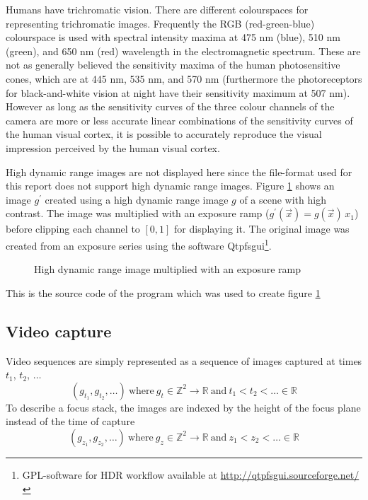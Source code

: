 \documentclass[a4paper,12pt]{book}
\begin{document}
Humans have trichromatic vision.
There are different colourspaces for representing trichromatic images.
Frequently the RGB (red-green-blue) colourspace is used with spectral
intensity maxima at 475 nm (blue), 510 nm (green), and 650 nm (red) wavelength
in the electromagnetic spectrum. These are not as generally believed the
sensitivity maxima of the human photosensitive cones, which are at 445 nm,
535 nm, and 570 nm\cite{RefWorks:440} (furthermore the photoreceptors for
black-and-white vision at night have their sensitivity maximum at 507 nm).
However as long as the sensitivity curves of the three colour channels of the
camera are more or less accurate linear combinations of the sensitivity curves
of the human visual cortex, it is possible to accurately reproduce the visual
impression perceived by the human visual cortex.

High dynamic range images are not displayed here since the file-format used
for this report does not support high dynamic range images.
Figure
\ref{fig:hdr} shows an image $g^\prime$ created using a high dynamic
range image $g$ of a scene with high contrast. The image was multiplied with
an exposure ramp ($g^\prime(\vec{x})=g(\vec{x})\,x_1$) before clipping each
channel to $[0,1]$ for displaying it. The original image was created from an
exposure series using the software
Qtpfsgui\footnote{GPL-software for HDR workflow available at
  \url{http://qtpfsgui.sourceforge.net/}}.
\begin{figure}
   \begin{center}
     \caption{High dynamic range image multiplied with an exposure
       ramp\label{fig:hdr}} %
   \end{center}
\end{figure}

This is the source code of the program which was used to create figure
\ref{fig:hdr}
\begin{scriptsize}
  
\end{scriptsize}

\subsection{Video capture}
Video sequences are simply represented as a sequence of images captured
at times $t_1$, $t_2$, $\ldots$
\begin{equation*}
  (g_{t_1},g_{t_2},\ldots)\mathrm{\ where\ }g_t\in\mathbb{Z}^2\to\mathbb{R}
  \mathrm{\ and\ }t_1<t_2<\ldots\in\mathbb{R}
\end{equation*}
To describe a focus stack, the images are indexed by the height of the
focus plane instead of the time of capture
\begin{equation*}
  (g_{z_1},g_{z_2},\ldots)\mathrm{\ where\ }g_z\in\mathbb{Z}^2\to\mathbb{R}
  \mathrm{\ and\ }z_1<z_2<\ldots\in\mathbb{R}
\end{equation*}
\end{document}
